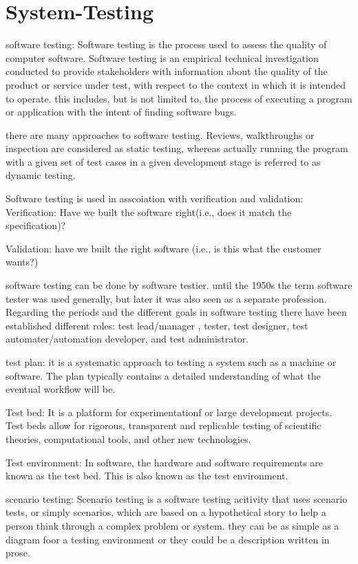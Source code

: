 \chapter{System-Testing}
software testing: 
Software testing is the process used to assess the quality of computer software. Software testing is an empirical technical
investigation conducted to provide stakeholders with information about the quality of the product or service under test, with respect to the context in which it is 
intended to operate. this includes, but is not limited to, the process of executing a program or application with the intent of finding software bugs. 

there are many approaches to software testing. Reviews, walkthroughs or inspection are considered as static testing, whereas actually running the program with a given set of test cases in a given
development stage is referred to as dynamic testing. 

Software testing is used in asscoiation with verification and validation: 
Verification: Have we built the software right(i.e., does it match the specification)?

Validation: have we built the right software (i.e., is this what the customer wants?)

software testing can be done by software testier. until the 1950s the term software tester was used generally, but later it was also seen as 
a separate profession. Regarding the periods and the different goals in software testing there have been established different roles:
test lead/manager , tester, test designer, test automater/automation developer, and test administrator.

test plan:
it is a systematic approach to testing a system such as a machine or software. The plan typically contains a detailed understanding of what the eventual
workflow will be. 

Test bed:
It is a platform for experimentationf or large development projects. Test beds allow for rigorous, transparent and replicable testing
of scientific theories, computational tools, and other new technologies. 

Test environment: 
In software, the hardware and software requirements are known as the test bed. This is also known as the test environment. 

scenario testing:
Scenario testing is a software testing acitivity that uses scenario tests, or simply scenarios, which are based on a hypothetical story to help a person 
think through a complex problem or system. they can be as simple as a diagram foor a testing environment or they could be a description written in prose. 

